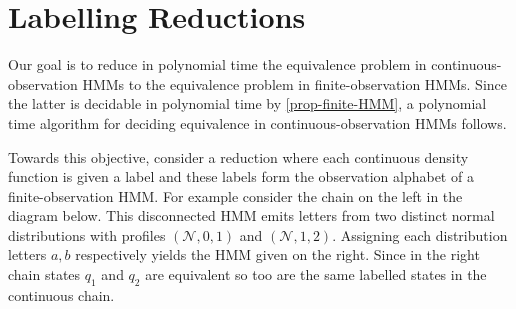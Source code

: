 \documentclass[a4paper,UKenglish,cleveref, autoref,mathscr, amsthm, thmtools, thm-restate]{lipics-v2019}
\newcommand{\1}{\mathbb{I}}
\begin{document}
\section{Labelling Reductions}\label{finitelabred}
Our goal is to reduce in polynomial time the equivalence problem in continuous-observation HMMs to the equivalence problem in finite-observation HMMs.
Since the latter is decidable in polynomial time by \cref{prop-finite-HMM}, a polynomial time algorithm for deciding equivalence in continuous-observation HMMs follows.

Towards this objective, consider a reduction where each continuous density function is given a label and these labels form the observation alphabet of a finite-observation HMM. For example consider the chain on the left in the diagram below. This disconnected HMM emits letters from two distinct normal distributions with profiles $(\mathcal{N}, 0, 1)$ and $(\mathcal{N}, 1, 2)$. Assigning each distribution letters $a,b$ respectively yields the HMM given on the right.
Since in the right chain states $q_1$ and $q_2$ are equivalent so too are the same labelled states in the continuous chain.
\end{document}
